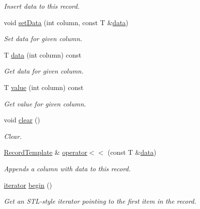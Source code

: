 \begin{DoxyCompactItemize}
\begin{DoxyCompactList}\small\item\em Insert data to this record. \end{DoxyCompactList}\item 
void \hyperlink{class_mdt_1_1_plain_text_1_1_record_template_ade0db0c77de8a059b2eb1886e2357b39}{set\+Data} (int column, const T \&\hyperlink{class_mdt_1_1_plain_text_1_1_record_template_aa6687a1e8e82a96fe3ae4d9fd79e8362}{data})
\begin{DoxyCompactList}\small\item\em Set data for given column. \end{DoxyCompactList}\item 
T \hyperlink{class_mdt_1_1_plain_text_1_1_record_template_aa6687a1e8e82a96fe3ae4d9fd79e8362}{data} (int column) const 
\begin{DoxyCompactList}\small\item\em Get data for given column. \end{DoxyCompactList}\item 
T \hyperlink{class_mdt_1_1_plain_text_1_1_record_template_a40b9e693eaa8543769405400edf49ba3}{value} (int column) const 
\begin{DoxyCompactList}\small\item\em Get value for given column. \end{DoxyCompactList}\item 
void \hyperlink{class_mdt_1_1_plain_text_1_1_record_template_a27f9ec39a33476e291db3475bc4954c4}{clear} ()
\begin{DoxyCompactList}\small\item\em Clear. \end{DoxyCompactList}\item 
\hyperlink{class_mdt_1_1_plain_text_1_1_record_template}{Record\+Template} \& \hyperlink{class_mdt_1_1_plain_text_1_1_record_template_adcba095ec625e542401e309072985f5b}{operator$<$$<$} (const T \&\hyperlink{class_mdt_1_1_plain_text_1_1_record_template_aa6687a1e8e82a96fe3ae4d9fd79e8362}{data})
\begin{DoxyCompactList}\small\item\em Appends a column with {\itshape data} to this record. \end{DoxyCompactList}\item 
\hyperlink{class_mdt_1_1_plain_text_1_1_record_template_a0785bfc19bfa479d1097dbfcfdd03bef}{iterator} \hyperlink{class_mdt_1_1_plain_text_1_1_record_template_a9dd45947652ce2969f4a8c3b98e852bc}{begin} ()
\begin{DoxyCompactList}\small\item\em Get an S\+T\+L-\/style iterator pointing to the first item in the record. \end{DoxyCompactList}\item 

\end{DoxyCompactItemize}
